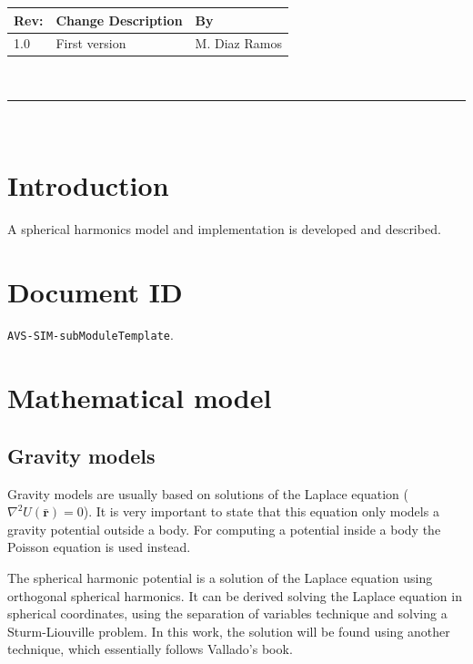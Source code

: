 \documentclass[]{AVSSimReportMemo}
\begin{document}
\makeCover


%
%
\pagestyle{empty}
{\renewcommand{\arraystretch}{2}
\noindent
\begin{longtable}{|p{0.5in}|p{4.5in}|p{1.14in}|}
\hline
{\bfseries Rev}: & {\bfseries Change Description} & {\bfseries By} \\
\hline
1.0 & First version & M. Diaz Ramos \\
\hline

\end{longtable}
}

\newpage
\setcounter{page}{1}
\pagestyle{fancy}

\tableofcontents
~\\ \hrule ~\\

\section{Introduction}

A spherical harmonics model and implementation is developed and described.

\section{Document ID}
{\tt AVS-SIM-subModuleTemplate}.  


\section{Mathematical model}

\subsection{Gravity models}

Gravity models are usually based on solutions of the Laplace equation ($\nabla^2 U(\mathbf{\bar r}) = 0$). It is very important to state that this equation only models a gravity potential outside a body. For computing a potential inside a body the Poisson equation is used instead.

The spherical harmonic potential is a solution of the Laplace equation using orthogonal spherical harmonics. It can be derived solving the Laplace equation in spherical coordinates, using the separation of variables technique and solving a Sturm-Liouville problem. In this work, the solution will be found using another technique, which essentially follows Vallado's book\cite{vallado2013}.
\end{document}
